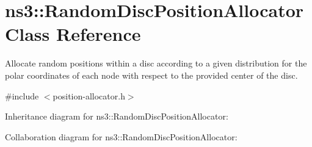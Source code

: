 \hypertarget{classns3_1_1RandomDiscPositionAllocator}{}\section{ns3\+:\+:Random\+Disc\+Position\+Allocator Class Reference}
\label{classns3_1_1RandomDiscPositionAllocator}


Allocate random positions within a disc according to a given distribution for the polar coordinates of each node with respect to the provided center of the disc.  




{\ttfamily \#include $<$position-\/allocator.\+h$>$}



Inheritance diagram for ns3\+:\+:Random\+Disc\+Position\+Allocator\+:


Collaboration diagram for ns3\+:\+:Random\+Disc\+Position\+Allocator\+:
